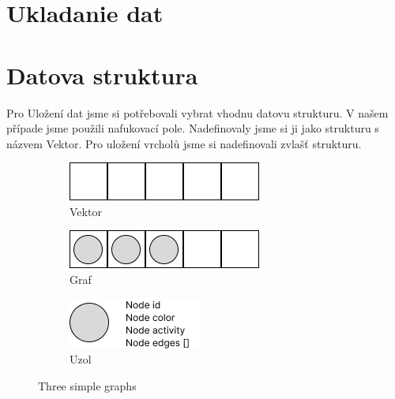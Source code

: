 \section{Ukladanie dat}

\section{Datova struktura}

Pro Uložení dat jsme si potřebovali vybrat vhodnu datovu strukturu. V našem případe jsme použili nafukovací pole.
Nadefinovaly jsme si ji jako strukturu s názvem Vektor. Pro uložení vrcholů jsme si nadefinovali zvlašť strukturu.

\begin{figure}[h]
    \centering
    \begin{subfigure}[b]{0.3\textwidth}
        \centering
        \includegraphics[width=\textwidth]{doc/fig/vector.png}
        \caption{Vektor}
        \label{fig:vector}
    \end{subfigure}
    \hfill
    \begin{subfigure}[b]{0.3\textwidth}
        \centering
        \includegraphics[width=\textwidth]{doc/fig/graph.png}
        \caption{Graf}
        \label{fig:graph}
    \end{subfigure}
    \hfill
    \begin{subfigure}[b]{0.3\textwidth}
        \centering
        \includegraphics[width=\textwidth]{doc/fig/node.png}
        \caption{Uzol}
        \label{fig:five over x}
    \end{subfigure}
    \caption{Three simple graphs}
    \label{fig:three graphs}
\end{figure}


